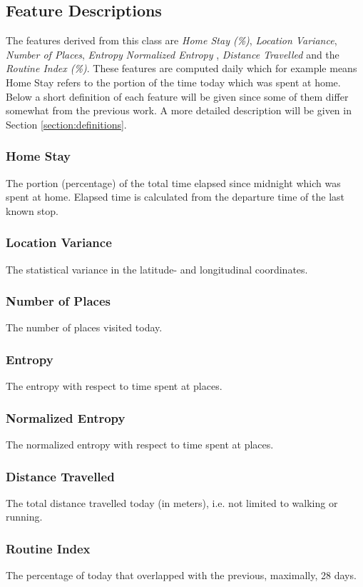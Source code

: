 \subsection{Feature Descriptions}
The features derived from this class are \textit{Home Stay (\%)}, \textit{Location Variance}, \textit{Number of Places}, \textit{Entropy} \textit{Normalized Entropy} , \textit{Distance Travelled} and the \textit{Routine Index (\%)}. These features are computed daily which for example means Home Stay refers to the portion of the time today which was spent at home. Below a short definition of each feature will be given since some of them differ somewhat from the previous work. A more detailed description will be given in Section \ref{section:definitions}.

\subsubsection*{Home Stay}
The portion (percentage) of the total time elapsed since midnight which was spent at home. Elapsed time is calculated from the departure time of the last known stop.

\subsubsection*{Location Variance}
The statistical variance in the latitude- and longitudinal coordinates.

\subsubsection*{Number of Places}
The number of places visited today.

\subsubsection*{Entropy}
The entropy with respect to time spent at places.

\subsubsection*{Normalized Entropy}
The normalized entropy with respect to time spent at places.

\subsubsection*{Distance Travelled}
The total distance travelled today (in meters), i.e. not limited to walking or running.

\subsubsection*{Routine Index}
The percentage of today that overlapped with the previous, maximally, 28 days.